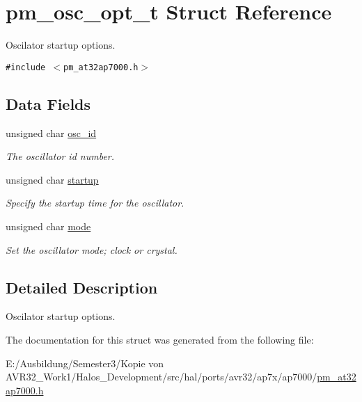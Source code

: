 \hypertarget{structpm__osc__opt__t}{
\section{pm\_\-osc\_\-opt\_\-t Struct Reference}
\label{structpm__osc__opt__t}
}
Oscilator startup options.  


{\tt \#include $<$pm\_\-at32ap7000.h$>$}

\subsection*{Data Fields}
\begin{CompactItemize}
\item 
\hypertarget{structpm__osc__opt__t_6735acf7c5cc5b9be3ce0eae78ee801b}{
unsigned char \hyperlink{structpm__osc__opt__t_6735acf7c5cc5b9be3ce0eae78ee801b}{osc\_\-id}}
\label{structpm__osc__opt__t_6735acf7c5cc5b9be3ce0eae78ee801b}

\begin{CompactList}\small\item\em The oscillator id number. \item\end{CompactList}\item 
\hypertarget{structpm__osc__opt__t_930ca8edc47fa42376295a42c3c518c6}{
unsigned char \hyperlink{structpm__osc__opt__t_930ca8edc47fa42376295a42c3c518c6}{startup}}
\label{structpm__osc__opt__t_930ca8edc47fa42376295a42c3c518c6}

\begin{CompactList}\small\item\em Specify the startup time for the oscillator. \item\end{CompactList}\item 
\hypertarget{structpm__osc__opt__t_30e7a4b78333d99dcb775c4112807679}{
unsigned char \hyperlink{structpm__osc__opt__t_30e7a4b78333d99dcb775c4112807679}{mode}}
\label{structpm__osc__opt__t_30e7a4b78333d99dcb775c4112807679}

\begin{CompactList}\small\item\em Set the oscillator mode; clock or crystal. \item\end{CompactList}\end{CompactItemize}


\subsection{Detailed Description}
Oscilator startup options. 

The documentation for this struct was generated from the following file:\begin{CompactItemize}
\item 
E:/Ausbildung/Semester3/Kopie von AVR32\_\-Work1/Halos\_\-Development/src/hal/ports/avr32/ap7x/ap7000/\hyperlink{pm__at32ap7000_8h}{pm\_\-at32ap7000.h}\end{CompactItemize}

